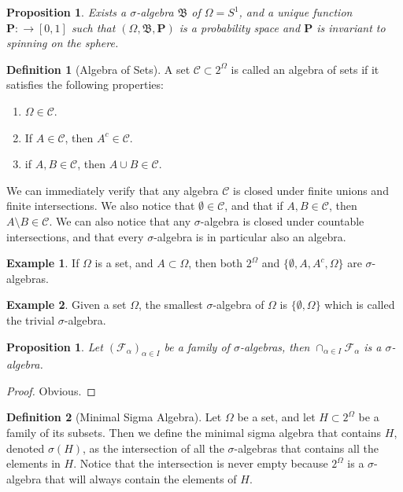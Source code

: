 \documentclass[11pt,a4paper]{article}
\theoremstyle{definition}
\newtheorem{definition}{Definition}[section]
\newtheorem{example}{Example}[section]
\theoremstyle{plain}
\newtheorem{proposition}[theorem]{Proposition}
\begin{document}
  \begin{proposition}
    Exists a $\sigma$-algebra $\mathfrak B$ of $\Omega = S^1$, and a unique
    function $\mathbf P \colon \mathfrak \to [0,1]$ such that 
    $(\Omega, \mathfrak B, \mathbf P)$ is a probability space and $\mathbf P$
    is invariant to spinning on the sphere.
  \end{proposition}

  \begin{definition}[Algebra of Sets]
    A set $\mathcal C \subset 2^\Omega$ is called an algebra of sets if it 
    satisfies the following properties:
    \begin{enumerate}
      \item $\Omega \in \mathcal C$.
      \item If $A \in \mathcal C$, then $A^c \in \mathcal C$.
      \item if $A,B \in \mathcal C$, then $A \cup B \in \mathcal C$.
    \end{enumerate}
  \end{definition}

  We can immediately verify that any algebra $\mathcal C$ is closed under
  finite unions and finite intersections. We also notice that 
  $\emptyset \in \mathcal C$, and that if $A,B \in \mathcal C$, then
  $A \setminus B \in \mathcal C$. We can also notice that any 
  $\sigma$-algebra is closed under countable intersections, and that
  every $\sigma$-algebra is in particular also an algebra.

  \begin{example}
    If $\Omega$ is a set, and $A \subset \Omega$, then both $2^\Omega$ and 
    $\{\emptyset, A, A^c, \Omega\}$ are $\sigma$-algebras.
  \end{example}

  \begin{example}
    Given a set $\Omega$, the smallest $\sigma$-algebra of $\Omega$ is
    $\{\emptyset, \Omega\}$ which is called the trivial $\sigma$-algebra.
  \end{example}
  
  \begin{proposition}
    Let $(\mathcal F_\alpha)_{\alpha \in I}$ be a family of $\sigma$-algebras,
    then $\cap_{\alpha \in I}{\mathcal F_\alpha}$ is a $\sigma$-algebra.
  \end{proposition}
  \begin{proof}
    Obvious.
  \end{proof}

  \begin{definition}[Minimal Sigma Algebra]
    Let $\Omega$ be a set, and let $H \subset 2^\Omega$ be a family of its
    subsets. Then we define the minimal sigma algebra that contains $H$,
    denoted $\sigma(H)$, as the intersection of all the $\sigma$-algebras
    that contains all the elements in $H$. Notice that the intersection is
    never empty because $2^\Omega$ is a $\sigma$-algebra that will always
    contain the elements of $H$.
  \end{definition}
\end{document}
